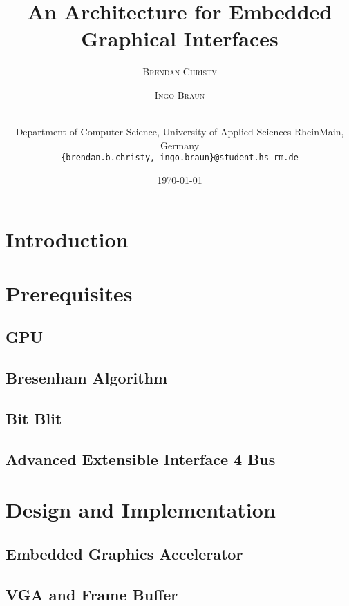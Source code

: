 \documentclass[a4paper]{article}
\title{An Architecture for Embedded Graphical Interfaces} %
\author{%
	\textsc{Brendan Christy} \and \textsc{Ingo Braun} \and\\[-2ex]
	\vspace{1pt} \footnotesize Department of Computer Science, University of Applied Sciences RheinMain, Germany \\ 
	\vspace{1pt} \footnotesize \texttt{\{brendan.b.christy, ingo.braun\}@student.hs-rm.de}
}
\date{\today} %
\begin{document}
	
	
	
	\maketitle
	
	\section{Introduction}
	
	
	\section{Prerequisites}
	
	\subsection{GPU}
	
	
	\subsection{Bresenham Algorithm}\label{subsec:bres}
	
	
	\subsection{Bit Blit}\label{subsec:blitter}
	
	
	\subsection{Advanced Extensible Interface 4 Bus} \label{subsec:axi}
	
	
	\section{Design and Implementation}
	
	\subsection{Embedded Graphics Accelerator}
	
	
	\subsection{VGA and Frame Buffer}
	
	
\end{document}
